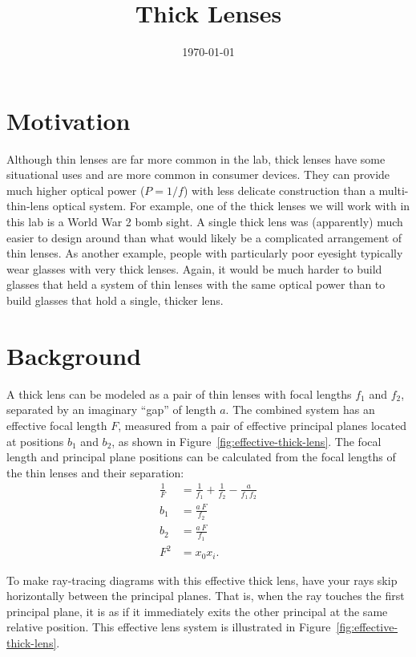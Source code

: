 \documentclass[]{manual}
\title{Thick Lenses}
\date{\today}
\begin{document}
    \maketitle
    \thispagestyle{firstpage}


    \section*{Motivation}

    Although thin lenses are far more common in the lab, thick lenses have some situational uses and are  more common in consumer devices.
    They can provide much higher optical power ($P = 1/f$) with less delicate construction than a multi-thin-lens optical system.
    For example, one of the thick lenses we will work with in this lab is a World War 2 bomb sight.
    A single thick lens was (apparently) much easier to design around than what would likely be a complicated arrangement of thin lenses.
    As another example, people with particularly poor eyesight typically wear glasses with very thick lenses.
    Again, it would be much harder to build glasses that held a system of thin lenses with the same optical power than to build glasses that hold a single, thicker lens.

    \section*{Background}

    A thick lens can be modeled as a pair of thin lenses with focal lengths $f_1$ and $f_2$, separated by an imaginary ``gap'' of length $a$.
    The combined system has an effective focal length $F$, measured from a pair of effective principal planes located at positions $b_1$ and $b_2$, as shown in Figure~\ref{fig:effective-thick-lens}.
    The focal length and principal plane positions can be calculated from the focal lengths of the thin lenses and their separation:
    \begin{align}
        \frac{1}{F} &= \frac{1}{f_1} + \frac{1}{f_2} - \frac{a}{f_1 \, f_2} \\
        b_1 &= \frac{a \, F}{f_2} \\
        b_2 &= \frac{a \, F}{f_1} \\
        F^2 &= x_0x_i.
    \end{align}

    To make ray-tracing diagrams with this effective thick lens, have your rays skip horizontally between the principal planes.
    That is, when the ray touches the first principal plane, it is as if it immediately exits the other principal at the same relative position.
    This effective lens system is illustrated in Figure~\ref{fig:effective-thick-lens}.
\end{document}
